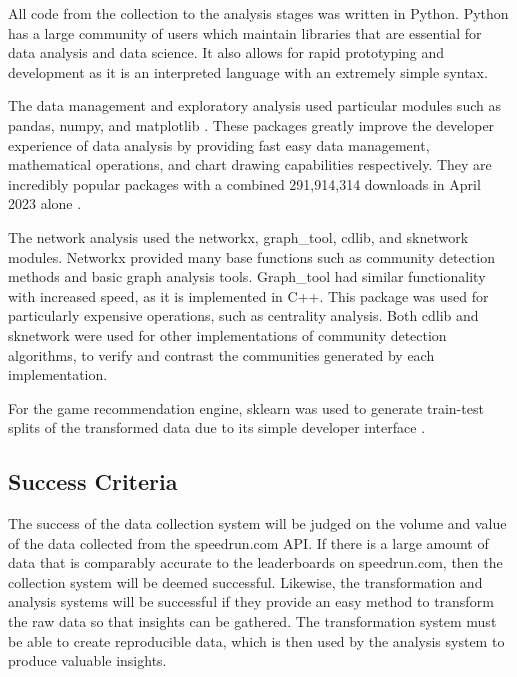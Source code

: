 All code from the collection to the analysis stages was written in Python. Python has a large community of users which maintain libraries that are essential for data analysis and data science. It also allows for rapid prototyping and development as it is an interpreted language with an extremely simple syntax. 


The data management and exploratory analysis used particular modules such as pandas, numpy, and matplotlib \cite{pandas, numpy, matplotlib}. These packages greatly improve the developer experience of data analysis by providing fast easy data management, mathematical operations, and chart drawing capabilities respectively. They are incredibly popular packages with a combined 291,914,314 downloads in April 2023 alone \cite{pypistats}. 


The network analysis used the networkx, graph\_tool, cdlib, and sknetwork \cite{networkx, cdlib, graph-tool, sknetwork} modules. Networkx provided many base functions such as community detection methods and basic graph analysis tools. Graph\_tool had similar functionality with increased speed, as it is implemented in C++. This package was used for particularly expensive operations, such as centrality analysis. Both cdlib and sknetwork were used for other implementations of community detection algorithms, to verify and contrast the communities generated by each implementation. 


For the game recommendation engine, sklearn was used to generate train-test splits of the transformed data due to its simple developer interface \cite{scikit-learn}.

\vspace{-5pt}
\subsection{Success Criteria}
\vspace{-5pt}

The success of the data collection system will be judged on the volume and value of the data collected from the speedrun.com API. If there is a large amount of data that is comparably accurate to the leaderboards on speedrun.com, then the collection system will be deemed successful. Likewise, the transformation and analysis systems will be successful if they provide an easy method to transform the raw data so that insights can be gathered. The transformation system must be able to create reproducible data, which is then used by the analysis system to produce valuable insights. 


